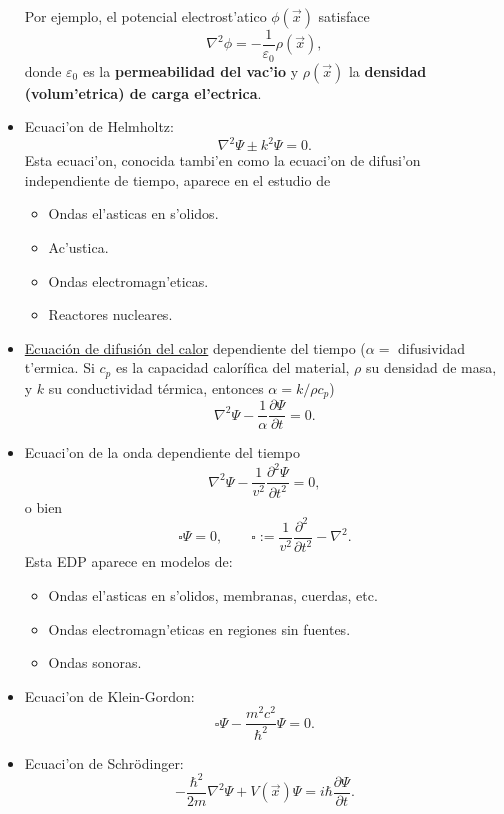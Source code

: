 \begin{itemize}
Por ejemplo, el potencial electrost'atico $\phi(\vec{x})$ satisface
\begin{equation}
\nabla^2\phi=-\frac{1}{\varepsilon_0}\rho(\vec{x}),
\end{equation}
donde $\varepsilon_0$ es la \textbf{permeabilidad del vac'io} y $\rho(\vec{x})$ la \textbf{densidad (volum'etrica) de carga el'ectrica}.
\item Ecuaci'on de Helmholtz: 
\begin{equation}
\nabla^2\Psi\pm k^2\Psi=0.
\end{equation}
Esta ecuaci'on, conocida tambi'en como la ecuaci'on de difusi'on independiente de tiempo, aparece en el estudio de
	\begin{itemize}
	\item Ondas el'asticas en s'olidos.
	\item Ac'ustica.
	\item Ondas electromagn'eticas.
	\item Reactores nucleares.
	\end{itemize}
\item \href{https://es.wikipedia.org/wiki/Ecuaci\%C3\%B3n_del_calor}{Ecuación de difusión del calor} dependiente del tiempo ($\alpha= $ difusividad t'ermica. Si $c_p$ es la capacidad calorífica del material, $\rho$ su densidad de masa, y $k$ su conductividad térmica, entonces $\alpha=k/\rho c_p$)
\begin{equation}\label{eccalor}
\nabla^2\Psi-\frac{1}{\alpha}\frac{\partial \Psi}{\partial t}=0 .
\end{equation}
\item Ecuaci'on de la onda dependiente del tiempo
\begin{equation}
\nabla^2\Psi-\frac{1}{v^2}\frac{\partial^2\Psi}{\partial t^2} =0,
\end{equation}
o bien 
\begin{equation}
\square\Psi=0, \qquad \square:=\frac{1}{v^2}\frac{\partial^2\ }{\partial t^2}-\nabla^2.
\end{equation}
Esta EDP aparece en modelos de:
\begin{itemize}
\item Ondas el'asticas en s'olidos, membranas, cuerdas, etc.
\item Ondas electromagn'eticas en regiones sin fuentes.
\item Ondas sonoras.
\end{itemize}

\item Ecuaci'on de Klein-Gordon:
\begin{equation}
\square\Psi-\frac{m^2c^2}{\hbar^2}\Psi=0.
\end{equation}

\item Ecuaci'on de Schr\"odinger:
\begin{equation}
-\frac{\hbar^2}{2m}\nabla^2\Psi+V(\vec{x})\Psi=i\hbar\frac{\partial\Psi}{\partial t}.
\end{equation}
\end{itemize}

